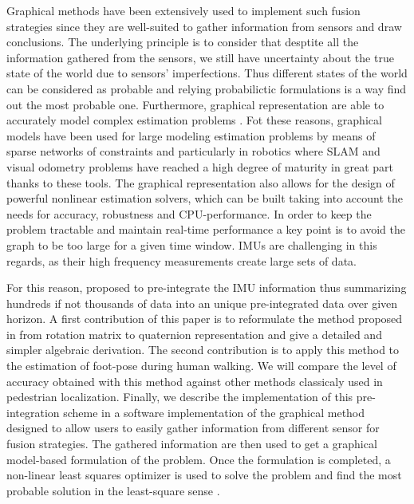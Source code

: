 Graphical methods have been extensively used to implement such fusion strategies \cite{Thrun:ijrr:2006,Kaess:itro:2008} since they are well-suited to gather information from sensors
and draw conclusions. The underlying principle is to consider that desptite all the information gathered from the sensors, we still have uncertainty about the true state of the world due to sensors' imperfections.
Thus different states of the world can be considered as probable and relying probabilictic formulations is a way find out the most probable one. Furthermore, graphical representation are able to accurately model 
complex estimation problems \cite{koller2009probabilistic}. 
Fot these reasons, graphical models have been used for large modeling estimation problems by means of sparse networks of constraints and particularly in
robotics where SLAM and visual odometry problems have reached a high degree of maturity in great part thanks to these tools.
The graphical representation also allows for the design of powerful nonlinear estimation solvers, which can be built taking into account the needs for accuracy, 
robustness and CPU-performance.
In order to keep the problem tractable and maintain real-time performance a key point is to avoid the graph to be too large for a given time window.
IMUs are challenging in this regards, as their high frequency measurements create large sets of data. 
 
For this reason, \cite{LUPTON-09,forster2015imu} proposed to pre-integrate the IMU information thus summarizing hundreds if not thousands of data into an unique
pre-integrated data over given horizon.
A first contribution of this paper is to reformulate the method proposed in \cite{forster2015imu} from rotation matrix to quaternion representation
and give a detailed and simpler algebraic derivation.
The second contribution is to apply this method to the estimation of foot-pose during human walking.
We will compare the level of accuracy obtained with this method against other methods classicaly used in pedestrian localization.
Finally, we describe the implementation of this pre-integration scheme in a software implementation of the graphical method designed to
allow users to easily gather information from different sensor for fusion strategies. The gathered information are then used to get a graphical model-based formulation of the problem. 
Once the formulation is completed, a non-linear least squares optimizer is used to solve the problem and find the most probable solution in the least-square sense \cite{ceres-solver}.





